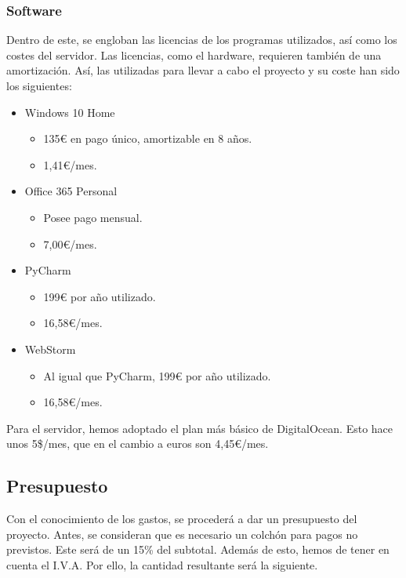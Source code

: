 \subsubsection{Software}
Dentro de este, se engloban las licencias de los programas utilizados, así como los costes del servidor.
Las licencias, como el hardware, requieren también de una amortización. Así, las utilizadas para llevar a cabo el proyecto y su coste han sido los siguientes:
\begin{itemize}
    \item Windows 10 Home
    \begin{itemize}
        \item 135€ en pago único, amortizable en 8 años.
        \item 1,41€/mes.
    \end{itemize}
    \item Office 365 Personal
    \begin{itemize}
        \item Posee pago mensual.
        \item 7,00€/mes.
    \end{itemize}
    \item PyCharm
    \begin{itemize}
        \item 199€ por año utilizado.
        \item 16,58€/mes.
    \end{itemize}
    \item WebStorm
    \begin{itemize}
        \item Al igual que PyCharm, 199€ por año utilizado.
        \item 16,58€/mes.
    \end{itemize}
\end{itemize}

Para el servidor, hemos adoptado el plan más básico de DigitalOcean. Esto hace unos 5\$/mes, que en el cambio a euros son 4,45€/mes.

\subsection{Presupuesto}
Con el conocimiento de los gastos, se procederá a dar un presupuesto del proyecto. Antes, se consideran que es necesario un colchón para pagos no previstos. Este será de un 15\% del subtotal. Además de esto, hemos de tener en cuenta el I.V.A. Por ello, la cantidad resultante será la siguiente.

